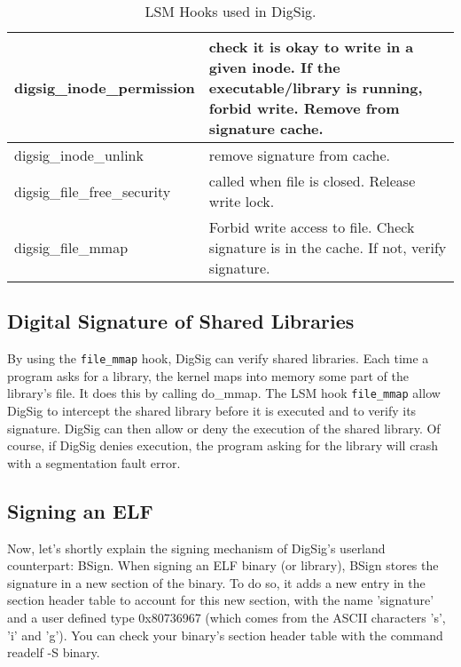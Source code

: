 \documentclass{article}
\begin{document}
\begin{table}[ht]
\begin{center}
\begin{tabular}{|p{5cm}|p{7cm}|}
\hline
digsig\_inode\_permission & check it is okay to write in a given inode. If the executable/library is running, forbid write. Remove from signature cache. \\

\hline
digsig\_inode\_unlink & remove signature from cache. \\

\hline
digsig\_file\_free\_security & called when file is closed. Release write lock.\\

\hline
digsig\_file\_mmap & Forbid write access to file. Check signature is in the cache. If not, verify signature.  \\

\hline
\end{tabular}
\caption{LSM Hooks used in DigSig.}
\label{tab:lsm-hooks}
\end{center}
\end{table}

\subsection{Digital Signature of Shared Libraries}

By using the {\tt file\_mmap} hook, DigSig can verify shared libraries.
Each time a program asks for a library, the kernel maps into memory some
part of the library's file.  It does this by calling do\_mmap.  The LSM hook 
{\tt file\_mmap} allow DigSig to intercept the shared library before it is 
executed and to verify its signature. DigSig can then allow or deny the
execution of the shared library.  Of course, if DigSig denies execution, the
program asking for the library will crash with a segmentation fault error.


\subsection{Signing an ELF}

Now, let's shortly explain the signing mechanism of
DigSig's userland counterpart: BSign. When signing an ELF binary (or library),
BSign stores the signature in a new section of the binary.  To do so,
it adds a new entry in the section header table to account for this new
section, with the name 'signature' and a user defined type 0x80736967
(which comes from the ASCII characters 's', 'i' and 'g'). You can
check your binary's section header table with the command readelf -S
binary.  
\end{document}
